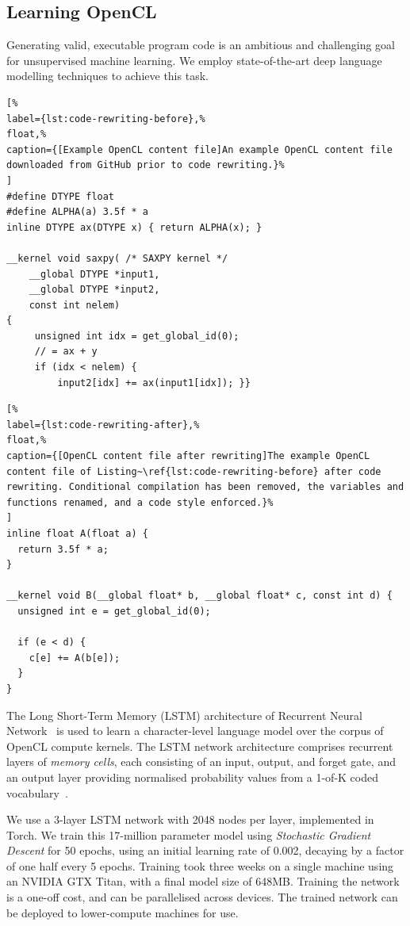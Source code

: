 \subsection{Learning OpenCL}
\label{sec:learning-opencl}

Generating valid, executable program code is an ambitious and challenging goal for unsupervised machine learning. We employ state-of-the-art deep language modelling techniques to achieve this task.

\lstset{language=[OpenCL]C}
\begin{lstlisting}[%
label={lst:code-rewriting-before},%
float,%
caption={[Example OpenCL content file]An example OpenCL content file downloaded from GitHub prior to code rewriting.}%
]
#define DTYPE float
#define ALPHA(a) 3.5f * a
inline DTYPE ax(DTYPE x) { return ALPHA(x); }

__kernel void saxpy( /* SAXPY kernel */
    __global DTYPE *input1,
    __global DTYPE *input2,
    const int nelem)
{
     unsigned int idx = get_global_id(0);
     // = ax + y
     if (idx < nelem) {
         input2[idx] += ax(input1[idx]); }}
\end{lstlisting}

\lstset{language=[OpenCL]C}
\begin{lstlisting}[%
label={lst:code-rewriting-after},%
float,%
caption={[OpenCL content file after rewriting]The example OpenCL content file of Listing~\ref{lst:code-rewriting-before} after code rewriting. Conditional compilation has been removed, the variables and functions renamed, and a code style enforced.}%
]
inline float A(float a) {
  return 3.5f * a;
}

__kernel void B(__global float* b, __global float* c, const int d) {
  unsigned int e = get_global_id(0);

  if (e < d) {
    c[e] += A(b[e]);
  }
}
\end{lstlisting}

The Long Short-Term Memory (LSTM) architecture of Recurrent Neural Network~\cite{Sundermeyer2012,Mikolov2015} is used to learn a character-level language model over the corpus of OpenCL compute kernels. The LSTM network architecture comprises recurrent layers of \emph{memory cells}, each consisting of an input, output, and forget gate, and an output layer providing normalised probability values from a 1-of-K coded vocabulary~\cite{Graves}.

We use a 3-layer LSTM network with 2048 nodes per layer, implemented in Torch. We train this 17-million parameter model using \textit{Stochastic Gradient Descent} for 50 epochs, using an initial learning rate of 0.002, decaying by a factor of one half every 5 epochs. Training took three weeks on a single machine using an NVIDIA GTX Titan, with a final model size of 648MB. Training the network is a one-off cost, and can be parallelised across devices. The trained network can be deployed to lower-compute machines for use.

